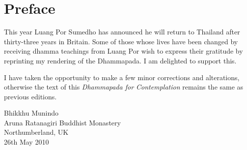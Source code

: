 
\chapter[Preface to the third edition (2010)]{Preface}

This year Luang Por Sumedho has announced he will return to Thailand after thirty-three years in Britain. Some  of  those whose  lives  have  been  changed  by  receiving dhamma  teachings  from  Luang  Por  wish to  express  their  gratitude  by  reprinting my rendering of the Dhammapada. I am delighted to support this.

I have taken the opportunity to make a few minor corrections and alterations, otherwise the text of this \emph{Dhammapada for Contemplation} remains the same as previous editions.

\bigskip

{\raggedleft
Bhikkhu Munindo\\
Aruna Ratanagiri Buddhist Monastery\\
Northumberland, UK\\
26th May 2010
\par}
